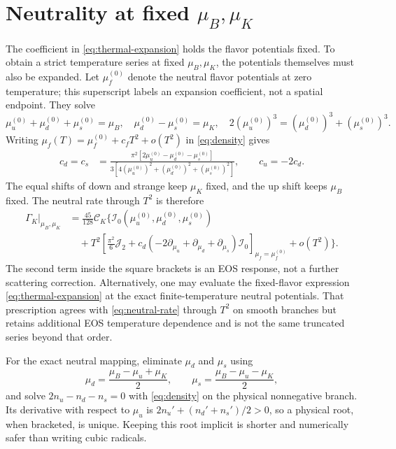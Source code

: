 \documentclass[11pt,letterpaper]{article}
\numberwithin{equation}{section}
\newcommand{\CK}{\mathcal C_K}
\newcommand{\Izero}{\mathcal I_0}
\newcommand{\Jtwo}{\mathcal J_2}
\begin{document}
\section{Neutrality at fixed \texorpdfstring{\(\mu_B,\mu_K\)}{muB, muK}}
\label{sec:neutral}
The coefficient in \cref{eq:thermal-expansion} holds the flavor potentials fixed.
To obtain a strict temperature series at fixed \(\mu_B,\mu_K\), the potentials themselves must also be expanded.
Let \(\mu_f^{(0)}\) denote the neutral flavor potentials at zero temperature; this superscript labels an expansion coefficient, not a spatial endpoint.
They solve
\begin{equation}
 \mu_u^{(0)}+\mu_d^{(0)}+\mu_s^{(0)}=\mu_B,
 \quad \mu_d^{(0)}-\mu_s^{(0)}=\mu_K,
 \quad 2(\mu_u^{(0)})^3=(\mu_d^{(0)})^3+(\mu_s^{(0)})^3.
 \label{eq:neutral-cold}
\end{equation}
Writing \(\mu_f(T)=\mu_f^{(0)}+c_fT^2+o(T^2)\) in \cref{eq:density} gives
\begin{align}
 c_d=c_s&=
 \frac{\pi^2[2\mu_u^{(0)}-\mu_d^{(0)}-\mu_s^{(0)}]}
 {3[4(\mu_u^{(0)})^2+(\mu_d^{(0)})^2+(\mu_s^{(0)})^2]},
 \qquad c_u=-2c_d.
 \label{eq:neutral-shifts}
\end{align}
The equal shifts of down and strange keep \(\mu_K\) fixed, and the up shift keeps \(\mu_B\) fixed.
The neutral rate through \(T^2\) is therefore
\begin{equation}
 \boxed{\begin{aligned}
 \Gamma_K\big|_{\mu_B,\mu_K}
 &=\frac{45}{128}\CK\Bigg\{
 \Izero(\mu_u^{(0)},\mu_d^{(0)},\mu_s^{(0)})\\
 &\quad+T^2\left[
 \frac{\pi^2}{6}\Jtwo+
 c_d\left(-2\partial_{\mu_u}+\partial_{\mu_d}+\partial_{\mu_s}\right)\Izero
 \right]_{\mu_f=\mu_f^{(0)}}+o(T^2)\Bigg\}.
 \end{aligned}}
 \label{eq:neutral-rate}
\end{equation}
The second term inside the square brackets is an EOS response, not a further scattering correction.
Alternatively, one may evaluate the fixed-flavor expression \cref{eq:thermal-expansion} at the exact finite-temperature neutral potentials.
That prescription agrees with \cref{eq:neutral-rate} through \(T^2\) on smooth branches but retains additional EOS temperature dependence and is not the same truncated series beyond that order.

For the exact neutral mapping, eliminate \(\mu_d\) and \(\mu_s\) using
\begin{equation}
 \mu_d=\frac{\mu_B-\mu_u+\mu_K}{2},
 \qquad \mu_s=\frac{\mu_B-\mu_u-\mu_K}{2},
 \label{eq:neutral-map}
\end{equation}
and solve \(2n_u-n_d-n_s=0\) with \cref{eq:density} on the physical nonnegative branch.
Its derivative with respect to \(\mu_u\) is \(2n_u'+(n_d'+n_s')/2>0\), so a physical root, when bracketed, is unique.
Keeping this root implicit is shorter and numerically safer than writing cubic radicals.
\end{document}
